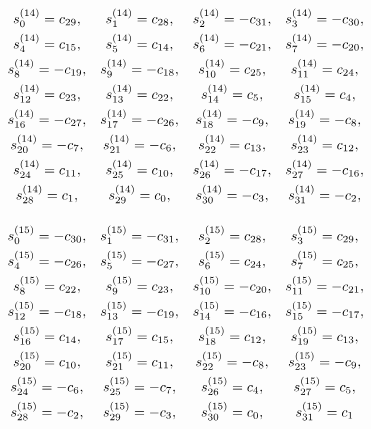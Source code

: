 \documentclass{jtacs}
\numberwithin{equation}{section}
\begin{document}
\begin{center}
\begin{adjustbox}{width=0.57\textwidth, margin=0 0 0 0}
$
\begin{array}{cccc}
\renewcommand*{\arraystretch}{1.5}
\begin{matrix}
s_{0}^{(14)}=c_{29}, & 	s_{1}^{(14)}=c_{28}, & 	s_{2}^{(14)}=-c_{31}, & 	s_{3}^{(14)}=-c_{30}, \\	s_{4}^{(14)}=c_{15}, & 	s_{5}^{(14)}=c_{14}, & 	s_{6}^{(14)}=-c_{21}, & 	s_{7}^{(14)}=-c_{20}, \\
s_{8}^{(14)}=-c_{19}, & 	s_{9}^{(14)}=-c_{18}, & 	s_{10}^{(14)}=c_{25}, & 	s_{11}^{(14)}=c_{24}, \\	s_{12}^{(14)}=c_{23}, & 	s_{13}^{(14)}=c_{22}, & 	s_{14}^{(14)}=c_{5}, & 	s_{15}^{(14)}=c_{4}, \\
s_{16}^{(14)}=-c_{27}, & 	s_{17}^{(14)}=-c_{26}, & 	s_{18}^{(14)}=-c_{9}, & 	s_{19}^{(14)}=-c_{8}, \\	s_{20}^{(14)}=-c_{7}, & 	s_{21}^{(14)}=-c_{6}, & 	s_{22}^{(14)}=c_{13}, & 	s_{23}^{(14)}=c_{12}, \\
s_{24}^{(14)}=c_{11}, & 	s_{25}^{(14)}=c_{10}, & 	s_{26}^{(14)}=-c_{17}, & 	s_{27}^{(14)}=-c_{16}, \\	s_{28}^{(14)}=c_{1}, & 	s_{29}^{(14)}=c_{0}, & 	s_{30}^{(14)}=-c_{3}, & 	s_{31}^{(14)}=-c_{2}, \\
\end{matrix}
\end{array}
$
\end{adjustbox}
\end{center}

\begin{center}
\begin{adjustbox}{width=0.57\textwidth, margin=0 10 0 0}
$
\begin{array}{cccc}
\renewcommand*{\arraystretch}{1.5}
\begin{matrix}
s_{0}^{(15)}=-c_{30}, & 	s_{1}^{(15)}=-c_{31}, & 	s_{2}^{(15)}=c_{28}, & 	s_{3}^{(15)}=c_{29}, \\
s_{4}^{(15)}=-c_{26}, & 	s_{5}^{(15)}=-c_{27}, & 	s_{6}^{(15)}=c_{24}, & 	s_{7}^{(15)}=c_{25}, \\
s_{8}^{(15)}=c_{22}, & 	s_{9}^{(15)}=c_{23}, & 	s_{10}^{(15)}=-c_{20}, & 	s_{11}^{(15)}=-c_{21}, \\
s_{12}^{(15)}=-c_{18}, & 	s_{13}^{(15)}=-c_{19}, & 	s_{14}^{(15)}=-c_{16}, & 	s_{15}^{(15)}=-c_{17}, \\
s_{16}^{(15)}=c_{14}, & 	s_{17}^{(15)}=c_{15}, & 	s_{18}^{(15)}=c_{12}, & 	s_{19}^{(15)}=c_{13}, \\	s_{20}^{(15)}=c_{10}, & 	s_{21}^{(15)}=c_{11}, & 	s_{22}^{(15)}=-c_{8}, & 	s_{23}^{(15)}=-c_{9}, \\
s_{24}^{(15)}=-c_{6}, & 	s_{25}^{(15)}=-c_{7}, & 	s_{26}^{(15)}=c_{4}, & 	s_{27}^{(15)}=c_{5}, \\
s_{28}^{(15)}=-c_{2}, & 	s_{29}^{(15)}=-c_{3}, & 	s_{30}^{(15)}=c_{0}, & 	s_{31}^{(15)}=c_{1} \\

\end{matrix}
\end{array}
$
\end{adjustbox}
\end{center}
\end{document}

